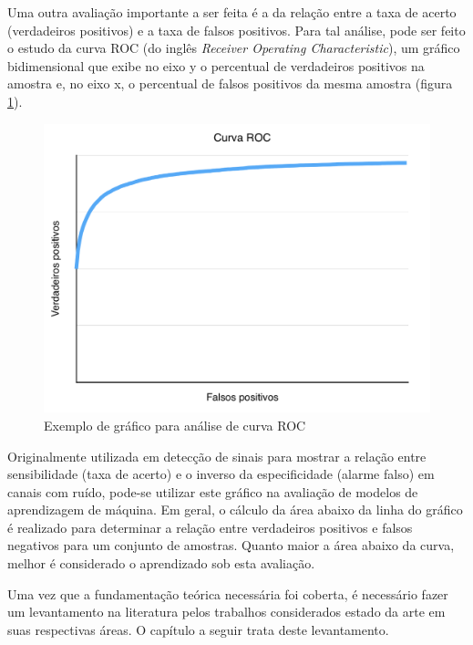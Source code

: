 Uma outra avaliação importante a ser feita é a da relação entre a taxa de acerto (verdadeiros positivos) e  a taxa de falsos positivos. Para tal análise, pode ser feito o estudo da curva ROC (do inglês \textit{Receiver Operating Characteristic}), um gráfico bidimensional que exibe no eixo y o percentual de verdadeiros positivos na amostra e, no eixo x, o percentual de falsos positivos da mesma amostra (figura \ref{fig:roc}).

\begin{figure}[h]
  \centering
  \includegraphics[scale=0.6]{imgs/roc}
  \caption{Exemplo de gráfico para análise de curva ROC}
  \label{fig:roc}
\end{figure}

Originalmente utilizada em detecção de sinais para mostrar a relação entre sensibilidade (taxa de acerto) e o inverso da especificidade (alarme falso) em canais com ruído, pode-se utilizar este gráfico na avaliação de modelos de aprendizagem de máquina. Em geral, o cálculo da área abaixo da linha do gráfico é realizado para determinar a relação entre verdadeiros positivos e falsos negativos para um conjunto de amostras. Quanto maior a área abaixo da curva, melhor é considerado o aprendizado sob esta avaliação.

Uma vez que a fundamentação teórica necessária foi coberta, é necessário fazer um levantamento na literatura pelos trabalhos considerados estado da arte em suas respectivas áreas. O capítulo a seguir trata deste levantamento.